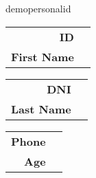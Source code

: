 \documentclass[6pt,letterpaper,spanish]{article}
\newcommand{\checkfor}[2]{%
  \ifcsname#1\endcsname%
    #2
  \else%
  \fi%
}
\begin{document}

\begin{flushright}
\end{flushright}

\checkfor{demopersonalid}{
\begin{minipage}{\textwidth}
\begin{center}
\begin{minipage}[t]{0.29\textwidth}
	\begin{tabular}{rl}
	\textbf{ID} & \demopersonalid\\
	\textbf{First Name} & \demopersonalfirstname\\
	\end{tabular}
\end{minipage}
\begin{minipage}[t]{0.29\textwidth}
	\begin{tabular}{rl}
	\textbf{DNI} & \demopersonaldni\\
	\textbf{Last Name} & \demopersonallastname\\
	\end{tabular}
\end{minipage}
\begin{minipage}[t]{0.29\textwidth}
	\begin{tabular}{rl}
	\textbf{Phone} & \demopersonalphone\\
	\textbf{Age} & \demopersonalage\\
	\end{tabular}
\end{minipage}
\end{center}
\end{minipage}
}
\end{document}
